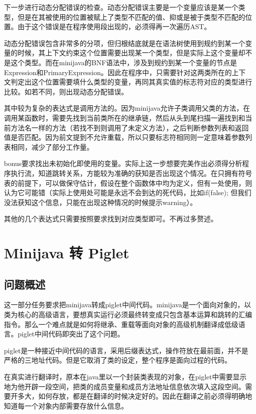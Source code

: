 \documentclass[10pt,a4paper]{article}
\begin{document}
	下一步进行动态分配错误的检查。动态分配错误主要是一个变量应该是某一个类型，但是在其被使用的位置被赋上了类型不匹配的值、抑或是被于类型不匹配的位置。由于这个错误是在程序使用段出现的，必须得再一次遍历AST。
	
	动态分配错误包含非常多的分项，但归根结底就是在语法树使用到规约到某一个变量的时候，其上下文约束这个位置需要出现某一个类型，但是实际上这个变量却不是这个类型。而在minijava的BNF语法中，涉及到规约到某一个变量的节点是Expression和PrimaryExpression。因此在程序中，只需要针对这两类所在的上下文判定出这个位置需要填什么类型的变量，再同其真实值的标志符对应的类型进行比较。如若不同，则出现动态分配错误。
	
	其中较为复杂的表达式是调用方法的。因为minijava允许子类调用父类的方法，在调用某函数时，需要先找到当前类所在的继承链，然后从头到尾扫描一遍找到和当前方法名一样的方法（若找不到则调用了未定义方法），之后判断参数列表和返回值是否匹配。因为前文提到不允许重载，所以只要标志符相同则一定意味着参数列表相同，减少了部分工作量。
	
	bonus要求找出未初始化即使用的变量。实际上这一步想要完美作出必须得分析程序执行流，知道跳转关系，方能较为准确的获知是否出现这个情况。在只拥有符号表的前提下，可以做保守估计，假设在整个函数体中均为定义，但有一处使用，则认为它可能错（实际上使用处可能是永远不会到达的死代码，比如if(false);	但我们没法获知这个信息，只能在出现这种情况的时候提示warning）。
	
	其他的几个表达式只需要按照要求找到对应类型即可。不再过多赘述。


\section{Minijava 转 Piglet}

\subsection{问题概述}

这一部分任务要求把minijava转成piglet中间代码。minijava是一个面向对象的，以类为核心的高级语言，要想真实运行必须最终转变成只包含基本运算和跳转的汇编指令。那么一个难点就是如何将继承、重载等面向对象的高级机制翻译成低级语言。piglet中间代码即突出了这个问题。

piglet是一种接近中间代码的语言，采用后缀表达式，操作符放在最前面，并不是严格的三地址代码。但是它取消了类的设定，整个程序是面向过程的代码。

在真实进行翻译时，原本在java里以一个封装类表现的对象，在piglet中需要显示地为他开辟一段空间，把类的成员变量和成员方法地址信息依次填入这段空间。需要开多大，如何存放，都是在翻译的时候决定好的。因此在翻译之前必须得明确地知道每一个对象内部需要存放什么信息。
\end{document}
